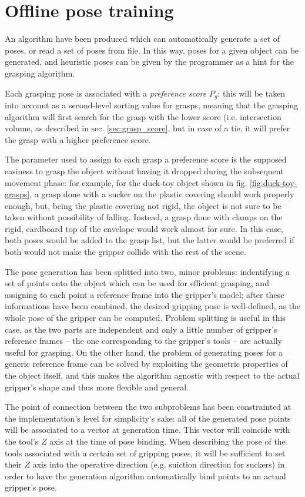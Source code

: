 \section{Offline pose training}
An algorithm have been produced which can automatically generate a set of
poses, or read a set of poses from file. In this way, poses for a given object
can be generated, and heuristic poses can be given by the programmer as a hint
for the grasping algorithm.  

Each grasping pose is associated with a \emph{preference score} $P_{g}$: this will be taken
into account as a second-level sorting value for grasps, meaning that the
grasping algorithm will first search for the grasp with the lower score (i.e.
intersection volume, as described in sec. \ref{sec:grasp_score}, but in case of
a tie, it will prefer the grasp with a higher preference score.

The parameter used to assign to each grasp a preference score is the supposed
easiness to grasp the object without having it dropped during the subsequent
movement phase: for example, for the duck-toy object shown in fig.
\ref{fig:duck-toy-grasps}, a grasp done with a sucker on the plastic covering
should work properly enough, but, being the plastic covering not rigid, the
object is not sure to be taken without possibility of falling. Instead, a grasp
done with clamps on the rigid, cardboard top of the envelope would work almost
for sure. In this case, both poses would be added to the grasp list, but the
latter would be preferred if both would not make the gripper collide with the
rest of the scene.

The pose generation has been splitted into two, minor problems: indentifying a
set of points onto the object which can be used for efficient grasping, and
assigning to each point a reference frame into the gripper's model; after these
informations have been combined, the desired gripping pose is well-defined, as the
whole pose of the gripper can be computed. Problem splitting is useful in this
case, as the two parts are independent and only a little number of gripper's
reference frames -- the one corresponding to the gripper's tools -- are actually
useful for grasping. On the other hand, the problem of  generating poses for a generic
reference frame can be solved by exploiting the geometric properties of the
object itself, and this makes the algorithm agnostic with respect to the actual
gripper's shape and thus more flexible and general.

The point of connection between the two subproblems has been constrainted at the
implementation's level for simplicity's sake: all of the generated pose
points will be associated to a vector at generation time. This vector will
coincide with the tool's $Z$ axis at the time of pose binding. When describing
the pose of the tools associated with a certain set of gripping poses, it will
be sufficient to set their $Z$ axis into the operative direction (e.g. suiction
direction for suckers) in order to have the generation algorithm automatically
bind points to an actual gripper's pose.

